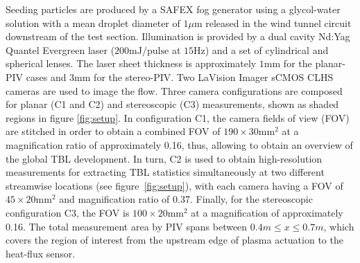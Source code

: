 Seeding particles are produced by a SAFEX fog generator using a glycol-water solution with a mean droplet diameter of $1 \mu\mathrm{m}$ released in the wind tunnel circuit downstream of the test section. Illumination is provided by a dual cavity Nd:Yag Quantel Evergreen laser ($200\mathrm{mJ/pulse}$ at $15\mathrm{Hz}$) and a set of cylindrical and spherical lenses. The laser sheet thickness is approximately $1\mathrm{mm}$ for the planar-PIV cases and $3\mathrm{mm}$ for the stereo-PIV. 
Two LaVision Imager sCMOS CLHS cameras are used to image the flow. Three camera configurations are composed for planar (C1 and C2) and stereoscopic (C3) measurements, shown as shaded regions in figure \ref{fig:setup}. In configuration C1, the camera fields of view (FOV) are stitched in order to obtain a combined FOV of $190\times30 \mathrm{mm}^2$ at a magnification ratio of approximately 0.16, thus, allowing to obtain an overview of the global TBL development. In turn, C2 is used to obtain high-resolution measurements for extracting TBL statistics simultaneously at two different streamwise locations (see figure~\ref{fig:setup}), with each camera having a FOV of $45\times20 \mathrm{mm}^2$ and magnification ratio of 0.37. Finally, for the stereoscopic configuration C3, the FOV is $100\times20 \mathrm{mm}^2$ at a magnification of approximately 0.16. The total measurement area by PIV spans between $0.4m\leq x \leq 0.7m$, which covers the region of interest from the upstream edge of plasma actuation to the heat-flux sensor.

